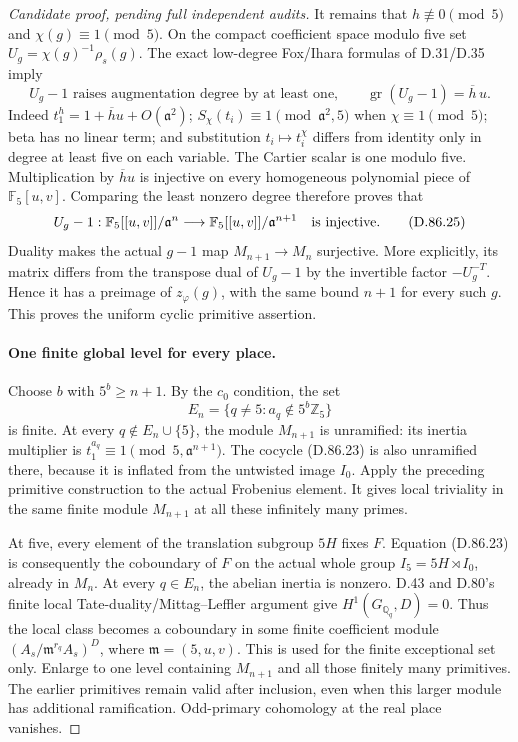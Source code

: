 \begin{proof}[Candidate proof, pending full independent audits]
It remains that \(h\not\equiv0\pmod5\) and
\(\chi(g)\equiv1\pmod5\). On the compact coefficient
space modulo five set
\(U_g=\chi(g)^{-1}\rho_s(g)\). The exact low-degree
Fox/Ihara formulas of D.31/D.35 imply
\[
 U_g-1\text{ raises augmentation degree by at least one,}
 \qquad \operatorname{gr}(U_g-1)=\overline h\,u.
                                                               \tag{D.86.24}
\]
Indeed \(t_1^h=1+\overline h u+O(\mathfrak a^2)\);
\(S_\chi(t_i)\equiv1\pmod{\mathfrak a^2,5}\) when
\(\chi\equiv1\pmod5\); beta has no linear term;
and substitution \(t_i\mapsto t_i^\chi\) differs from
identity only in degree at least five on each variable.
The Cartier scalar is one modulo five. Multiplication by
\(\overline h u\) is injective on every homogeneous
polynomial piece of \(\mathbb F_5[u,v]\). Comparing the
least nonzero degree therefore proves that
\[
 U_g-1:\mathbb F_5[[u,v]]/\mathfrak a^n
          \longrightarrow
          \mathbb F_5[[u,v]]/\mathfrak a^{n+1}
                    \quad\hbox{is injective}.          \tag{D.86.25}
\]
Duality makes the actual \(g-1\) map
\(M_{n+1}\to M_n\) surjective. More explicitly, its
matrix differs from the transpose dual of \(U_g-1\)
by the invertible factor \(-U_g^{-T}\). Hence it has
a preimage of \(z_\varphi(g)\), with the same bound
\(n+1\) for every such \(g\). This proves the uniform
cyclic primitive assertion.

\paragraph{One finite global level for every place.}
Choose \(b\) with \(5^b\ge n+1\). By the \(c_0\)
condition, the set
\[
          E_n=\{q\ne5:a_q\notin5^b\mathbb Z_5\}
                                                               \tag{D.86.26}
\]
is finite. At every \(q\notin E_n\cup\{5\}\), the
module \(M_{n+1}\) is unramified: its inertia multiplier
is \(t_1^{a_q}\equiv1\pmod{5,\mathfrak a^{n+1}}\).
The cocycle (D.86.23) is also unramified there, because
it is inflated from the untwisted image \(I_0\).
Apply the preceding primitive construction to the actual
Frobenius element. It gives local triviality in the same
finite module \(M_{n+1}\) at all these infinitely many
primes.

At five, every element of the translation subgroup \(5H\)
fixes \(F\). Equation (D.86.23) is consequently the
coboundary of \(F\) on the actual whole group
\(I_5=5H\rtimes I_0\), already in \(M_n\).
At every \(q\in E_n\), the abelian inertia is nonzero.
D.43 and D.80's finite local Tate-duality/Mittag--Leffler
argument give
\(H^1(G_{\mathbb Q_q},D)=0\). Thus the local class
becomes a coboundary in some finite coefficient module
\((A_s/\mathfrak m^{r_q}A_s)^D\), where
\(\mathfrak m=(5,u,v)\). This is used for the finite
exceptional set only. Enlarge to one level containing
\(M_{n+1}\) and all those finitely many primitives.
The earlier primitives remain valid after inclusion, even
when this larger module has additional ramification.
Odd-primary cohomology at the real place vanishes.


\end{proof}
